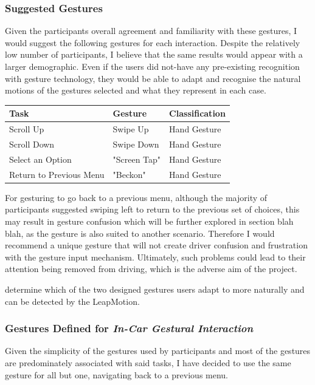 \documentclass{l4proj}
\begin{document}
\subsubsection{Suggested Gestures}
\vspace{-3mm}
Given the participants overall agreement and familiarity with these gestures, I would suggest the following gestures for each interaction. Despite the relatively low number of participants, I believe that the same results would appear with a larger demographic. Even if the users did not-have any pre-existing recognition with gesture technology, they would be able to adapt and recognise the natural motions of the gestures selected and what they represent in each case.

\begin{table}[h!]
\centering
    \begin{tabular}{|l|l|l|}
    \hline{}
    \textbf{Task}                    & \textbf{Gesture}      & \textbf{Classification} \\ \hline
    Scroll Up               & Swipe Up     & Hand Gesture   \\ \hline
    Scroll Down             & Swipe Down   & Hand Gesture   \\ \hline
    Select an Option        & "Screen Tap" & Hand Gesture   \\ \hline
    Return to Previous Menu & "Beckon"     & Hand Gesture   \\ \hline
    \end{tabular}
\end{table}

For gesturing to go back to a previous menu, although the majority of participants suggested swiping left to return to the previous set of choices, this may result in gesture confusion which will be further explored in section blah blah, as the gesture is also suited to another scenario. Therefore I would recommend a unique gesture that will not create driver confusion and frustration with the gesture input mechanism. Ultimately, such problems could lead to their attention being removed from driving, which is the adverse aim of the project. 

determine which of the two designed gestures users adapt to more naturally and can be detected by the LeapMotion.
\subsubsection{Gestures Defined for \textbf{\textit{In-Car Gestural Interaction}}}
\vspace{-3mm}
Given the simplicity of the gestures used by participants and most of the gestures are predominately associated with said tasks, I have decided to use the same gesture for all but one, navigating back to a previous menu. 
\end{document}

